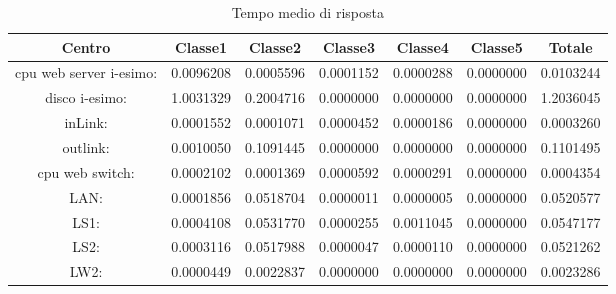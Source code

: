 \begin{table}[H]
\begin{center}\begin{scriptsize}
\begin{tabular}{||c|c|c|c|c|c|c||}
\hline
Centro &Classe1 &Classe2 &Classe3 &Classe4 &Classe5 &Totale\\
\hline
\hline
 cpu web server i-esimo: 	&0.0096208	&0.0005596	&0.0001152	&0.0000288	&0.0000000	&0.0103244\\
\hline
 disco i-esimo: 	&1.0031329	&0.2004716	&0.0000000	&0.0000000	&0.0000000	&1.2036045\\
\hline
 inLink: 	&0.0001552	&0.0001071	&0.0000452	&0.0000186	&0.0000000	&0.0003260\\
\hline
 outlink: 	&0.0010050	&0.1091445	&0.0000000	&0.0000000	&0.0000000	&0.1101495\\
\hline
 cpu web switch: 	&0.0002102	&0.0001369	&0.0000592	&0.0000291	&0.0000000	&0.0004354\\
\hline
 LAN: 	&0.0001856	&0.0518704	&0.0000011	&0.0000005	&0.0000000	&0.0520577\\
\hline
 LS1: 	&0.0004108	&0.0531770	&0.0000255	&0.0011045	&0.0000000	&0.0547177\\
\hline
 LS2: 	&0.0003116	&0.0517988	&0.0000047	&0.0000110	&0.0000000	&0.0521262\\
\hline
 LW2: 	&0.0000449	&0.0022837	&0.0000000	&0.0000000	&0.0000000	&0.0023286\\
\hline
\end{tabular}
\end{scriptsize}\end{center}
\caption{Tempo medio di risposta}
\label{tempomediodirisposta}
\end{table}

